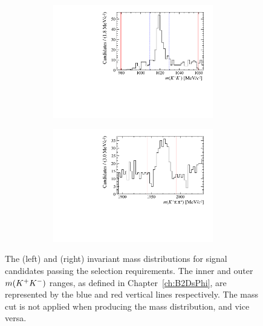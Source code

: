 \begin{figure}[!h]
\begin{subfigure}[t]{1.0\textwidth}
   \end{subfigure}   
   \begin{subfigure}[t]{1.0\textwidth}
   \centering
     \begin{subfigure}[t]{0.35\textwidth}
        \centering
        \includegraphics[width=1.0\textwidth]{figs/Selection/Phimass_KPiPi_B2DsPhi.pdf}
     \end{subfigure}
     \begin{subfigure}[t]{0.35\textwidth}
        \centering
        \includegraphics[width=1.0\textwidth]{figs/Selection/Dmass_KPiPi_B2DsPhi.pdf}
     \end{subfigure}
     \caption{\decay{\Bp}{(\decay{\Dsp}{\Kp\pim\pip})\phiz}}
   \end{subfigure}
   \caption{The \phiz (left) and \Dsp (right) invariant mass distributions for signal \decay{\Bp}{\Dsp\phiz} candidates passing the selection requirements. The inner and outer $m({{K}^+}{{K}^-})$ ranges, as defined in Chapter~\ref{ch:B2DsPhi}, are represented by the blue and red vertical lines respectively. The \Dsp mass cut is not applied when producing the \phiz mass distribution, and vice versa.}
   \label{fig:d_phi_mass_signal}   
\end{figure}
